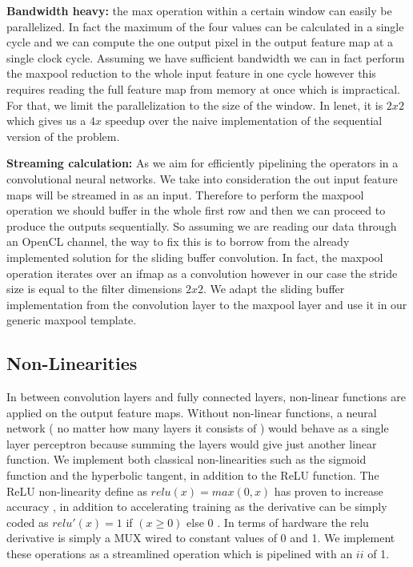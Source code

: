 \textbf{Bandwidth heavy:} the max operation within a certain window can easily be parallelized. In fact the maximum of the four values can be calculated in a single cycle and we can compute the one output pixel in the output feature map at a single clock cycle. Assuming we have sufficient bandwidth we can in fact perform the maxpool reduction to the whole input feature in one cycle however this requires reading the full feature map from memory at once which is impractical. For that, we limit the parallelization to the size of the window. In lenet, it is $ 2x2 $ which gives us a $ 4x $ speedup over the naive implementation of the sequential version of the problem. 

\textbf{Streaming calculation:} As we aim for efficiently pipelining the operators in a convolutional neural networks. We take into consideration the out input feature maps will be streamed in as an input. Therefore to perform the maxpool operation we should buffer in the whole first row and then we can proceed to produce the outputs sequentially. So assuming we are reading our data through an OpenCL channel, the way to fix this is to borrow from the already implemented solution for the sliding buffer convolution. In fact, the maxpool operation iterates over an ifmap as a convolution however in our case the stride size is equal to the filter dimensions $ 2x2 $. We adapt the sliding buffer implementation from the convolution layer to the maxpool layer and use it in our generic maxpool template. 

\subsection{Non-Linearities} 

In between convolution layers and fully connected layers, non-linear functions are applied on the output feature maps. Without non-linear functions, a neural network ( no matter how many layers it consists of ) would behave as a single layer perceptron because summing the layers would give just another linear function. We implement both classical non-linearities such as the sigmoid function and the hyperbolic tangent, in addition to the ReLU function. The ReLU non-linearity  define as $ relu(x)  = max(0, x) $ has proven to increase accuracy \cite{alexnet}, in addition to accelerating training as the derivative can be simply coded as $ relu'(x) = 1 $ if $ (x \geq 0 ) $ else $ 0 $ .  In terms of hardware the relu derivative is simply a MUX wired to constant values of 0 and 1. We implement these operations as a streamlined operation which is pipelined with an $ ii $ of 1.

